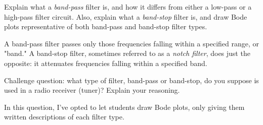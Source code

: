 

Explain what a {\it band-pass} filter is, and how it differs from either a low-pass or a high-pass filter circuit.  Also, explain what a {\it band-stop} filter is, and draw Bode plots representative of both band-pass and band-stop filter types.







A band-pass filter passes only those frequencies falling within a specified range, or "band."  A band-stop filter, sometimes referred to as a {\it notch filter}, does just the opposite: it attenuates frequencies falling within a specified band.

\vskip 10pt

Challenge question: what type of filter, band-pass or band-stop, do you suppose is used in a radio receiver (tuner)?  Explain your reasoning.







In this question, I've opted to let students draw Bode plots, only giving them written descriptions of each filter type.




